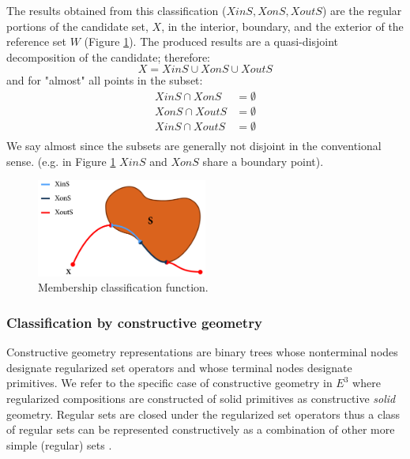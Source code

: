\documentclass[a4paper,11pt,oneside]{article}
\begin{document}
The results obtained from this classification ($XinS, XonS, XoutS$) are the regular portions of the candidate set, $X$, in the interior, boundary, and the exterior of the reference set $W$ (Figure \ref{sec3.2:membership_classification}). The produced results are a quasi-disjoint decomposition of the candidate; therefore:
\begin{equation}
	X = XinS \cup XonS \cup XoutS
\end{equation}
and for "almost" all points in the subset:
\begin{align*}
	XinS \cap XonS  & = \emptyset \\
	XonS \cap XoutS & = \emptyset \\
	XinS \cap XoutS & = \emptyset \\
\end{align*}
We say almost since the subsets are generally not disjoint in the conventional sense. (e.g. in Figure \ref{sec3.2:membership_classification} $XinS$ and $XonS$ share a boundary point). \cite{mansfield_1987}



\begin{figure}[ht]
	\begin{center}
		\includegraphics[width=0.5\textwidth]{section3/3.2/membership-classification.png}
	\end{center}
	\caption{Membership classification function.}
	\label{sec3.2:membership_classification}
\end{figure}

\subsubsection{Classification by constructive geometry}

Constructive geometry representations are binary trees whose nonterminal nodes designate regularized set operators and whose terminal nodes designate primitives.  We refer to the specific case of constructive geometry in $E^3$ where regularized compositions are constructed of solid primitives as constructive \textit{solid} geometry. Regular sets are closed under the regularized set operators thus a class of regular sets can be represented constructively as a combination of other more simple (regular) sets \cite{Requicha1978MathematicalFO}. 
\end{document}
